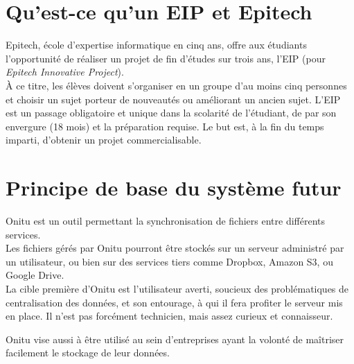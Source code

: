 \section{Qu'est-ce qu'un EIP et Epitech}
Epitech, école d'expertise informatique en cinq ans, offre aux étudiants l'opportunité de réaliser un projet de fin d'études sur trois ans, l'EIP (pour \emph{Epitech Innovative Project}).\\

À ce titre, les élèves doivent s'organiser en un groupe d'au moins cinq personnes et choisir un sujet porteur de nouveautés ou améliorant un ancien sujet. L'EIP est un passage obligatoire et unique dans la scolarité de l'étudiant, de par son envergure (18 mois) et la préparation requise. Le but est, à la fin du temps imparti, d'obtenir un projet commercialisable.


\section{Principe de base du système futur}
Onitu est un outil permettant la synchronisation de fichiers entre différents services.\\

Les fichiers gérés par Onitu pourront être stockés sur un serveur administré par un utilisateur, ou bien sur des services tiers comme Dropbox, Amazon S3, ou Google Drive.\\

La cible première d'Onitu est l'utilisateur averti, soucieux des problématiques de centralisation des données, et son entourage, à qui il fera profiter le serveur mis en place. Il n'est pas forcément technicien, mais assez curieux et connaisseur.

Onitu vise aussi à être utilisé au sein d'entreprises ayant la volonté de maîtriser facilement le stockage de leur données.\\
